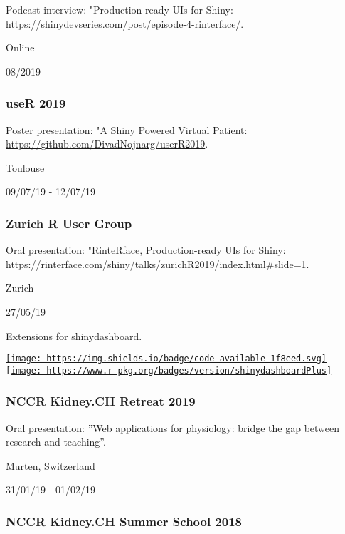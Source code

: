 \documentclass[
]{article}
\begin{document}
Podcast interview: "Production-ready UIs for Shiny:
\url{https://shinydevseries.com/post/episode-4-rinterface/}.

Online

08/2019

\hypertarget{user-2019}{%
\subsubsection{useR 2019}\label{user-2019}}

Poster presentation: "A Shiny Powered Virtual Patient:
\url{https://github.com/DivadNojnarg/userR2019}.

Toulouse

09/07/19 - 12/07/19

\hypertarget{zurich-r-user-group-1}{%
\subsubsection{Zurich R User Group}\label{zurich-r-user-group-1}}

Oral presentation: "RinteRface, Production-ready UIs for Shiny:
\url{https://rinterface.com/shiny/talks/zurichR2019/index.html\#slide=1}.

Zurich

27/05/19

Extensions for shinydashboard.

\href{https://github.com/RinteRface/shinydashboardPlus}{\texttt{[image: https://img.shields.io/badge/code-available-1f8eed.svg]}}
\href{https://cran.r-project.org/package=shinydashboardPlus}{\texttt{[image: https://www.r-pkg.org/badges/version/shinydashboardPlus]}}

\hypertarget{nccr-kidney.ch-retreat-2019}{%
\subsubsection{NCCR Kidney.CH Retreat
2019}\label{nccr-kidney.ch-retreat-2019}}

Oral presentation: ''Web applications for physiology: bridge the gap
between research and teaching''.

Murten, Switzerland

31/01/19 - 01/02/19

\hypertarget{nccr-kidney.ch-summer-school-2018}{%
\subsubsection{NCCR Kidney.CH Summer School
2018}\label{nccr-kidney.ch-summer-school-2018}}
\end{document}
